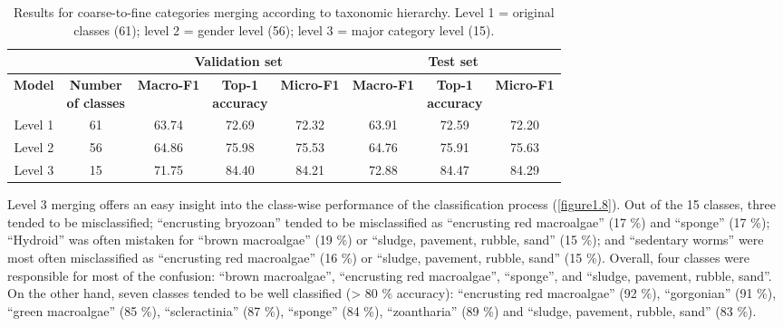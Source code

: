 \begin{table}[htbp]
  \centering
  \normalsize
  \caption[Results for coarse-to-fine categories merging according to taxonomic hierarchy]{Results for coarse-to-fine categories merging according to taxonomic hierarchy. Level 1 = original classes (61); level 2 = gender level (56); level 3 = major category level (15).}
  \label{table1.6}
  \begin{tabular}{*{2}{c}|*{3}{c}|*{3}{c}}
        \toprule
        \multicolumn{2}{c}{\textbf{}}               & \multicolumn{3}{c}{\textbf{Validation set}}                     & \multicolumn{3}{c}{\textbf{Test set}}                           \\ \midrule
        \textbf{Model} & \makecell{\textbf{Number} \\ \textbf{of classes}} & \textbf{Macro-F1} & \makecell{\textbf{Top-1} \\ \textbf{accuracy}} & \textbf{Micro-F1} & \textbf{Macro-F1} & \makecell{\textbf{Top-1} \\ \textbf{accuracy}} & \textbf{Micro-F1} \\
        \midrule
        Level 1        & 61                         & 63.74             & 72.69                   & 72.32             & 63.91             & 72.59                   & 72.20             \\
        Level 2        & 56                         & 64.86             & 75.98                   & 75.53             & 64.76             & 75.91                   & 75.63             \\
        Level 3        & 15                         & 71.75             & 84.40                   & 84.21             & 72.88             & 84.47                   & 84.29             \\ \bottomrule
    \end{tabular}
\end{table}

Level 3 merging offers an easy insight into the class-wise performance of the classification process (\autoref{figure1.8}). Out of the 15 classes, three tended to be misclassified; “encrusting bryozoan” tended to be misclassified as “encrusting red macroalgae” (17 \%) and “sponge” (17 \%); “Hydroid” was often mistaken for “brown macroalgae” (19 \%) or “sludge, pavement, rubble, sand” (15 \%); and “sedentary worms” were most often misclassified as “encrusting red macroalgae” (16 \%) or “sludge, pavement, rubble, sand” (15 \%). Overall, four classes were responsible for most of the confusion: “brown macroalgae”, “encrusting red macroalgae”, “sponge”, and “sludge, pavement, rubble, sand”. On the other hand, seven classes tended to be well classified (> 80 \% accuracy): “encrusting red macroalgae” (92 \%), “gorgonian” (91 \%), “green macroalgae” (85 \%), “scleractinia” (87 \%), “sponge” (84 \%), “zoantharia” (89 \%) and “sludge, pavement, rubble, sand” (83 \%).

